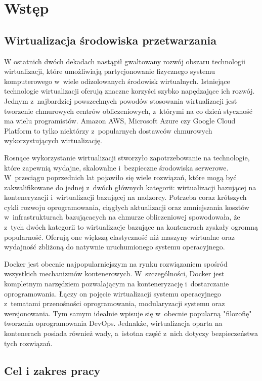 \chapter{Wstęp}

\section{Wirtualizacja środowiska przetwarzania}

W ostatnich dwóch dekadach nastąpił gwałtowany rozwój obszaru technologii wirtualizacji, które umożliwiają partycjonowanie fizycznego systemu komputerowego w~wiele odizolowanych środowisk wirtualnych. Istniejące technologie wirtualizacji oferują znaczne korzyści szybko napędzające ich rozwój. Jednym z~najbardziej powszechnych powodów stosowania wirtualizacji jest tworzenie chmurowych centrów obliczeniowych, z~którymi na co dzień styczność ma wielu programistów. Amazon AWS, Microsoft Azure czy Google Cloud Platform to tylko niektórzy z~popularnych dostawców chmurowych wykorzystujących wirtualizację.

Rosnące wykorzystanie wirtualizacji stworzyło zapotrzebowanie na technologie, które zapewnią wydajne, skalowalne i~bezpieczne środowiska serwerowe. W~przeciągu poprzednich lat pojawiło się wiele rozwiązań, które mogą być zakwalifikowane do jednej z~dwóch głównych kategorii: wirtualizacji bazującej na konteneryzacji i~wirtualizacji bazującej na nadzorcy. Potrzeba coraz krótszych cykli rozwoju oprogramowania, ciągłych aktualizacji oraz zmniejszania kosztów w~infrastrukturach bazującacych na chmurze obliczeniowej spowodowała, że z~tych dwóch kategorii to wirtualizacje bazujące na kontenerach zyskały ogromną popularność. Oferują one większą elastyczność niż maszyny wirtualne oraz wydajność zbliżoną do natywnie uruchumionego systemu operacyjnego. 

Docker jest obecnie najpopularniejszym na rynku rozwiązaniem spośród wszystkich mechanizmów kontenerowych. W~szczególności, Docker jest kompletnym narzędziem pozwalającym na konteneryzację i~dostarczanie oprogramowania. Łączy on pojęcie wirtualizacji systemu operacyjnego z~tematami przenośności oprogramowania, modularyzacji systemu oraz wersjonowania. Tym samym idealnie wpisuje się w~obecnie popularną "filozofię" tworzenia oprogramowania DevOps. Jednakże, wirtualizacja oparta na kontenerach posiada również wady, a~istotna część z~nich dotyczy bezpieczeństwa tych rozwiązań.

\section{Cel i zakres pracy}

